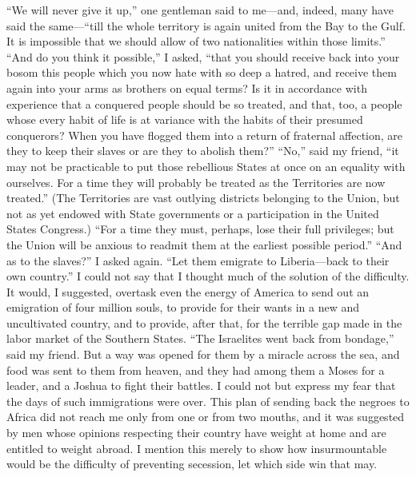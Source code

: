 ``We will never give it up,'' one gentleman said to me---and, indeed,
many have said the same---``till the whole territory is again united
from the Bay to the Gulf.  It is impossible that we should allow of
two nationalities within those limits.''  ``And do you think it
possible,'' I asked, ``that you should receive back into your bosom
this people which you now hate with so deep a hatred, and receive
them again into your arms as brothers on equal terms?  Is it in
accordance with experience that a conquered people should be so
treated, and that, too, a people whose every habit of life is at
variance with the habits of their presumed conquerors?  When you
have flogged them into a return of fraternal affection, are they to
keep their slaves or are they to abolish them?''  ``No,'' said my
friend, ``it may not be practicable to put those rebellious States
at once on an equality with ourselves.  For a time they will
probably be treated as the Territories are now treated.''  (The
Territories are vast outlying districts belonging to the Union, but
not as yet endowed with State governments or a participation in the
United States Congress.)  ``For a time they must, perhaps, lose
their full privileges; but the Union will be anxious to readmit
them at the earliest possible period.''  ``And as to the slaves?'' I
asked again.  ``Let them emigrate to Liberia---back to their own
country.''  I could not say that I thought much of the solution of
the difficulty.  It would, I suggested, overtask even the energy of
America to send out an emigration of four million souls, to provide
for their wants in a new and uncultivated country, and to provide,
after that, for the terrible gap made in the labor market of the
Southern States.  ``The Israelites went back from bondage,'' said my
friend.  But a way was opened for them by a miracle across the sea,
and food was sent to them from heaven, and they had among them a
Moses for a leader, and a Joshua to fight their battles.  I could
not but express my fear that the days of such immigrations were
over.  This plan of sending back the negroes to Africa did not
reach me only from one or from two mouths, and it was suggested by
men whose opinions respecting their country have weight at home and
are entitled to weight abroad.  I mention this merely to show how
insurmountable would be the difficulty of preventing secession, let
which side win that may.

